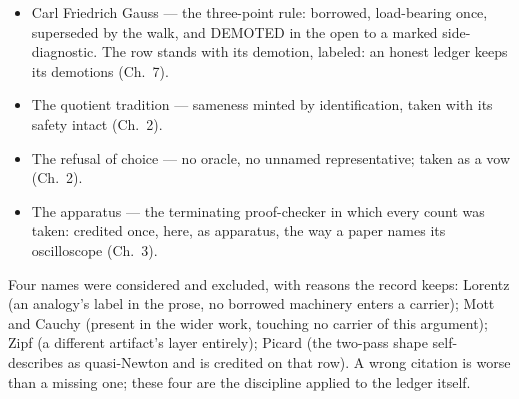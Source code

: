 \begin{itemize}
\item Carl Friedrich Gauss --- the three-point rule: borrowed, load-bearing
once, superseded by the walk, and DEMOTED in the open to a marked
side-diagnostic. The row stands with its demotion, labeled: an honest ledger
keeps its demotions (Ch.~7).
\item The quotient tradition --- sameness minted by identification, taken with
its safety intact (Ch.~2).
\item The refusal of choice --- no oracle, no unnamed representative; taken as
a vow (Ch.~2).
\item The apparatus --- the terminating proof-checker in which every count was
taken: credited once, here, as apparatus, the way a paper names its
oscilloscope (Ch.~3).
\end{itemize}

Four names were considered and excluded, with reasons the record keeps: Lorentz
(an analogy's label in the prose, no borrowed machinery enters a carrier); Mott
and Cauchy (present in the wider work, touching no carrier of this argument);
Zipf (a different artifact's layer entirely); Picard (the two-pass shape
self-describes as quasi-Newton and is credited on that row). A wrong citation
is worse than a missing one; these four are the discipline applied to the
ledger itself.

